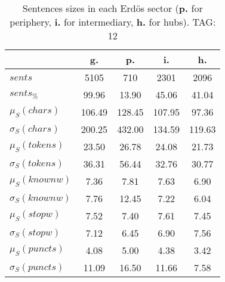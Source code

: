 \begin{table}[h!]
\begin{center}
\begin{tabular}{| l || c | c | c | c |}\hline
 & {\bf g.} & {\bf p.} & {\bf i.} & {\bf h.} \\\hline\hline
$sents$ & 5105  & 710  & 2301  & 2096 \\
$sents_{\%}$ & 99.96  & 13.90  & 45.06  & 41.04 \\\hline
$\mu_S(chars)$ & 106.49  & 128.45  & 107.95  & 97.36 \\
$\sigma_S(chars)$ & 200.25  & 432.00  & 134.59  & 119.63 \\\hline
$\mu_S(tokens)$ & 23.50  & 26.78  & 24.08  & 21.73 \\
$\sigma_S(tokens)$ & 36.31  & 56.44  & 32.76  & 30.77 \\\hline
$\mu_S(knownw)$ & 7.36  & 7.81  & 7.63  & 6.90 \\
$\sigma_S(knownw)$ & 7.76  & 12.45  & 7.22  & 6.04 \\\hline
$\mu_S(stopw)$ & 7.52  & 7.40  & 7.61  & 7.45 \\
$\sigma_S(stopw)$ & 7.12  & 6.45  & 6.90  & 7.56 \\\hline
$\mu_S(puncts)$ & 4.08  & 5.00  & 4.38  & 3.42 \\
$\sigma_S(puncts)$ & 11.09  & 16.50  & 11.66  & 7.58 \\\hline
\end{tabular}
\caption{Sentences sizes in each Erd\"os sector ({{\bf p.}} for periphery, {{\bf i.}} for intermediary, {{\bf h.}} for hubs). TAG: 12}
\end{center}
\end{table}